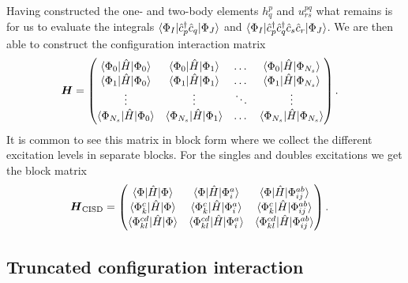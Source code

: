        Having constructed the one- and two-body elements $h^{p}_{q}$ and
        $u^{pq}_{rs}$ what remains is for us to evaluate the integrals
        $\langle \Phi_I |\hat{c}_{p}^{\dagger}\hat{c}_{q}| \Phi_J \rangle$ and
        $\langle \Phi_I |\hat{c}_{p}^{\dagger}\hat{c}_{q}^{\dagger}\hat{c}_{s}\hat{c}_{r}| \Phi_J \rangle$.
        We are then able to construct the configuration interaction matrix
        \begin{align}
            \boldsymbol{H}
            &=
            \begin{pmatrix}
                \langle \Phi_0 |\hat{H}| \Phi_0 \rangle &
                \langle \Phi_0 |\hat{H}| \Phi_1 \rangle &
                \dots &
                \langle \Phi_0 |\hat{H}| \Phi_{N_s} \rangle \\
                \langle \Phi_1 |\hat{H}| \Phi_0 \rangle &
                \langle \Phi_1 |\hat{H}| \Phi_1 \rangle &
                \dots &
                \langle \Phi_1 |\hat{H}| \Phi_{N_s} \rangle \\
                \vdots & \vdots & \ddots & \vdots \\
                \langle \Phi_{N_s} |\hat{H}| \Phi_0 \rangle &
                \langle \Phi_{N_s} |\hat{H}| \Phi_1 \rangle &
                \dots &
                \langle \Phi_{N_s} |\hat{H}| \Phi_{N_s} \rangle
            \end{pmatrix}.
        \end{align}
        It is common to see this matrix in block form where we collect
        the different excitation levels in separate blocks.
        For the singles and doubles excitations we get the block matrix
        \begin{align}
            \boldsymbol{H}_{\text{CISD}}
            &=
            \begin{pmatrix}
                \langle \Phi |\hat{H}| \Phi \rangle &
                \langle \Phi |\hat{H}| \Phi^{a}_{i} \rangle &
                \langle \Phi |\hat{H}| \Phi^{ab}_{ij} \rangle \\
                \langle \Phi^{c}_{k} |\hat{H}| \Phi \rangle &
                \langle \Phi^{c}_{k} |\hat{H}| \Phi^{a}_{i} \rangle &
                \langle \Phi^{c}_{k} |\hat{H}| \Phi^{ab}_{ij} \rangle \\
                \langle \Phi^{cd}_{kl} |\hat{H}| \Phi \rangle &
                \langle \Phi^{cd}_{kl} |\hat{H}| \Phi^{a}_{i} \rangle &
                \langle \Phi^{cd}_{kl} |\hat{H}| \Phi^{ab}_{ij} \rangle \\
            \end{pmatrix}.
        \end{align}

        \subsection{Truncated configuration interaction}

